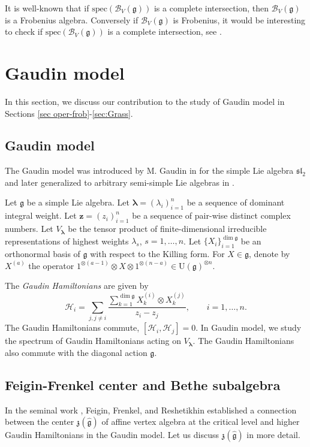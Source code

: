 \documentclass[11pt,reqno]{amsart}
\numberwithin{equation}{section}
\theoremstyle{definition}
\theoremstyle{remark}
\newcommand{\beq}{\begin{equation}}
\newcommand{\eeq}{\end{equation}}
\newcommand{\mc}{\mathcal}
\newcommand{\slt}{{\mathfrak{sl}_2}}
\newcommand{\g}{\mathfrak{g}}
\newcommand{\la}{\lambda}
\newcommand{\bla}{\bm\lambda}
\newcommand{\Ug}{\mathrm{U}(\mathfrak{g})}
\newcommand{\zg}{\mathfrak{z}(\widehat{\g})}
\begin{document}
It is well-known that if $\mathrm{spec}(\mc B_V(\g))$ is a complete intersection, then $\mc B_V(\g)$ is a Frobenius algebra. Conversely if $\mc B_V(\g)$ is Frobenius, it would be interesting to check if $\mathrm{spec}(\mc B_V(\g))$ is a complete intersection, see \cite{MTV:2009b}.

\section{Gaudin model}
In this section, we discuss our contribution \cite{LMV:2016,LMV:2018,Lu:2018,LM:2018,Lu:2019} to the study of Gaudin model in Sections \ref{sec oper-frob}-\ref{sec:Grass}.
\subsection{Gaudin model}\label{sec Gaudin intro}
The Gaudin model was introduced by M. Gaudin in \cite{Ga:1976} for the simple Lie algebra $\slt$ and later generalized to arbitrary semi-simple Lie algebras in \cite[Section 13.2.2]{Ga:1983}. 

Let $\g$ be a simple Lie algebra. Let $\bla=(\la_i)_{i=1}^n$ be a sequence of dominant integral weight. Let $\bm z=(z_i)_{i=1}^n$ be a sequence of pair-wise distinct complex numbers. Let $V_{\bla}$ be the tensor product of finite-dimensional irreducible representations of highest weights $\la_s$, $s=1,\dots,n$. Let $\{X_i\}_{i=1}^{\dim\g}$ be an orthonormal basis of $\g$ with respect to the Killing form. For $X\in\g$, denote by $X^{(a)}$ the operator $1^{\otimes(a-1)}\otimes X\otimes 1^{\otimes(n-a)}\in \Ug^{\otimes n}$.

The \emph{Gaudin Hamiltonians} are given by
\beq\label{eq Gaudin}
\mathcal H_i=\sum_{j,j\ne i}\frac{\sum_{k=1}^{\dim \g} X_k^{(i)}\otimes X_{k}^{(j)}}{z_i-z_j},\qquad i=1,\dots,n.
\eeq
The Gaudin Hamiltonians commute, $[\mc H_i,\mc H_j]=0$. In Gaudin model, we study the spectrum of Gaudin Hamiltonians acting on $V_{\bla}$. The Gaudin Hamiltonians also commute with the diagonal action $\g$. 

\subsection{Feigin-Frenkel center and Bethe subalgebra}
In the seminal work \cite{FFRe}, Feigin, Frenkel, and Reshetikhin established a connection between the center $\zg$ of affine vertex algebra at the critical level and higher Gaudin Hamiltonians in the Gaudin model. Let us discuss $\zg$ in more detail.
\end{document}
